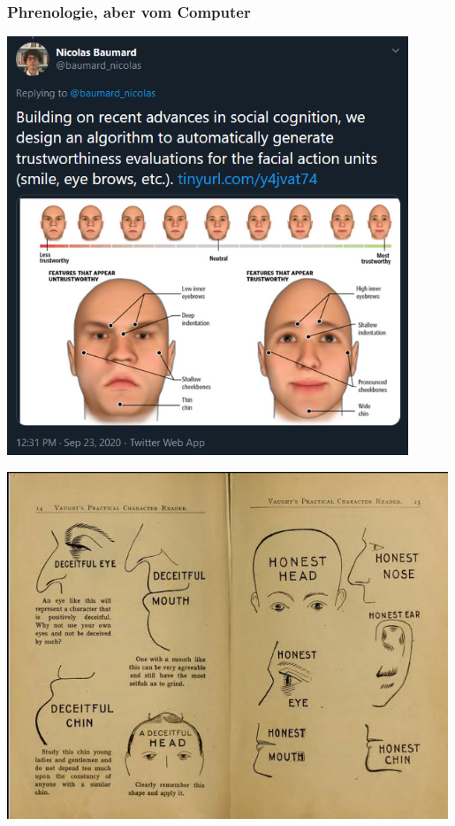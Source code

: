 \documentclass[aspectratio=169,x11names]{beamer}
\begin{document}
\begin{frame}
\frametitle{Phrenologie, aber vom Computer}
\begin{minipage}{.455\textwidth}
\begin{center}
\includegraphics[width=0.9\textwidth, keepaspectratio]{images/phrenology.png}
\end{center}
\end{minipage}\begin{minipage}{.545\textwidth}
\begin{center}
\includegraphics[width=0.99\textwidth, keepaspectratio]{images/phrenology.jpg}
\end{center}
\end{minipage}
\end{frame}
\end{document}
